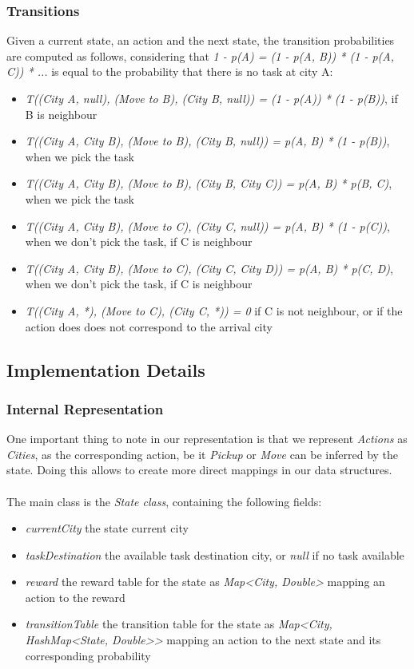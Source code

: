 \documentclass[11pt]{article}
\begin{document}
\subsubsection{Transitions}
Given a current state, an action and the next state, the transition probabilities are computed as follows, considering that \textit{1 - p(A) = (1 - p(A, B)) * (1 - p(A, C)) * ...} is equal to the probability that there is no task at city A:
\begin{itemize}
	\item \textit{T((City A, null), (Move to B), (City B, null)) = (1 - p(A)) * (1 - p(B))}, if B is neighbour
	\item \textit{T((City A, City B), (Move to B), (City B, null)) = p(A, B) * (1 - p(B))}, when we pick the task
	\item \textit{T((City A, City B), (Move to B), (City B, City C)) = p(A, B) * p(B, C)}, when we pick the task
	\item \textit{T((City A, City B), (Move to C), (City C, null)) = p(A, B) * (1 - p(C))}, when we don't pick the task, if C is neighbour
	\item \textit{T((City A, City B), (Move to C), (City C, City D)) = p(A, B) * p(C, D)}, when we don't pick the task, if C is neighbour
	\item \textit{T((City A, *), (Move to C), (City C, *)) = 0} if C is not neighbour, or if the action does does not correspond to the arrival city
\end{itemize}

\subsection{Implementation Details}
\subsubsection{Internal Representation}
One important thing to note in our representation is that we represent \textit{Actions} as \textit{Cities}, as the corresponding action, be it \textit{Pickup} or \textit{Move} can be inferred by the state. Doing this allows to create more direct mappings in our data structures.
\\
\\
The main class is the \textit{State class}, containing the following fields: 
\begin{itemize}
	\item \textit{currentCity} the state current city
	\item \textit{taskDestination} the available task destination city, or \textit{null} if no task available
	\item \textit{reward} the reward table for the state as \textit{Map<City, Double>} mapping an action to the reward
	\item \textit{transitionTable} the transition table for the state as \textit{Map<City, HashMap<State, Double>{}>} mapping an action to the next state and its corresponding probability
\end{itemize}
\end{document}
